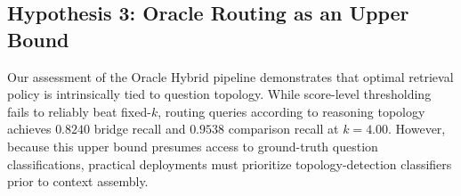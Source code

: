 \documentclass{article}
\begin{document}
\subsection{Hypothesis 3: Oracle Routing as an Upper Bound}
Our assessment of the Oracle Hybrid pipeline demonstrates that optimal retrieval policy is intrinsically tied to question topology. While score-level thresholding fails to reliably beat fixed-$k$, routing queries according to reasoning topology achieves $0.8240$ bridge recall and $0.9538$ comparison recall at $k=4.00$. However, because this upper bound presumes access to ground-truth question classifications, practical deployments must prioritize topology-detection classifiers prior to context assembly.

\end{document}
